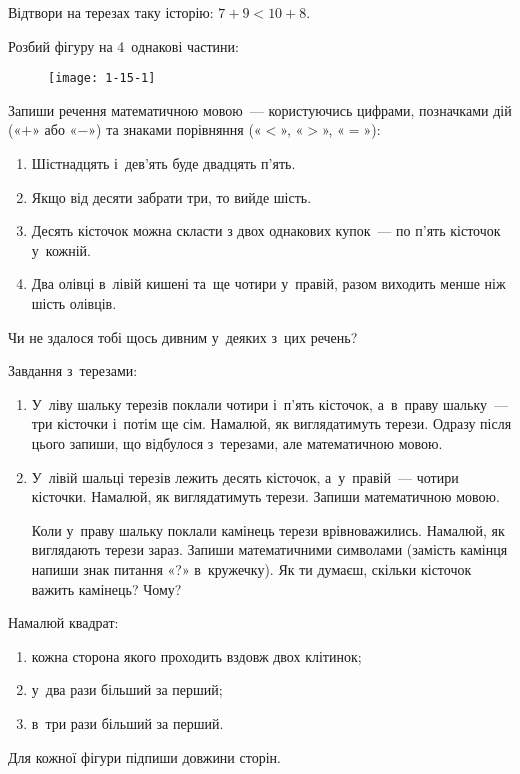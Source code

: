 \problem
Відтвори на терезах таку історію: $7+9 < 10+8$.


\problem
Розбий фігуру на 4~однакові частини:

\begin{figure}[ht]
  \centering
  \texttt{[image: 1-15-1]}
\end{figure}


\problem
Запиши речення математичною мовою~--- користуючись цифрами,
позначками дій («$+$» або «$-$») та знаками порівняння («$<$», «$>$», «$=$»):
\begin{enumerate}
  \item Шістнадцять і~дев'ять буде двадцять п'ять.
  \item Якщо від десяти забрати три, то вийде шість.
  \item Десять кісточок можна скласти з двох однакових купок~---
  по п'ять кісточок у~кожній.
  \item Два олівці в~лівій кишені та~ще чотири у~правій,
  разом виходить менше ніж шість олівців.
\end{enumerate}
Чи не здалося тобі щось дивним у~деяких з~цих речень?

\problem
Завдання з~терезами:
\begin{enumerate}
  \item У~ліву шальку терезів поклали чотири і~п'ять кісточок,
  а~в~праву шальку~--- три кісточки і~потім ще сім.
  Намалюй, як виглядатимуть терези.
  Одразу після цього запиши, що відбулося з~терезами,
  але математичною мовою.
  \item У~лівій шальці терезів лежить десять кісточок,
  а~у~правій~--- чотири кісточки.
  Намалюй, як виглядатимуть терези. Запиши математичною мовою.

  Коли у~праву шальку поклали камінець терези врівноважились.
  Намалюй, як виглядають терези зараз.
  Запиши математичними символами
  (замість камінця напиши знак питання «?» в~кружечку).
  Як ти думаєш, скільки кісточок важить камінець? Чому?
\end{enumerate}


\problem
Намалюй квадрат:
\begin{enumerate}
  \item кожна сторона якого проходить вздовж двох клітинок;
  \item у~два рази більший за перший;
  \item в~три рази більший за перший.
\end{enumerate}
Для кожної фігури підпиши довжини сторін.


